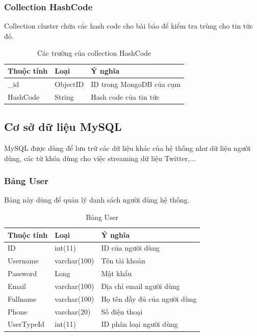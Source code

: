 		\subsubsection{Collection HashCode}
		Collection cluster chứa các hash code cho bài báo để kiểm tra trùng cho tin tức đó.
		\begin{table}[H]
			\setlength\extrarowheight{3pt}
			\begin{tabular}{|l|l|p{9cm}|}
				\hline
				\textbf{Thuộc tính}     & \textbf{Loại} & \textbf{Ý nghĩa} \\\hline
				\_id           & ObjectID       &  ID trong MongoDB của cụm\\\hline
				HashCode      & String           & Hash code của tin tức\\\hline
			\end{tabular}%
			\caption{Các trường của collection HashCode}
			\label{tab:table_3_3}%
		\end{table}%

	\subsection{Cơ sở dữ liệu MySQL}
	MySQL được dùng để lưu trữ các dữ liệu khác của hệ thống như dữ liệu người dùng, các từ khóa dùng cho việc streaming dữ liệu Twitter,...
		\subsubsection{Bảng User}
		Bảng này dùng để quản lý danh sách người dùng hệ thống.
			\begin{table}[H]
				\centering
				\setlength\extrarowheight{3pt}
				\begin{tabular}{|l|l|l|}
					\hline
					\textbf{Thuộc tính} & \textbf{Loại} & \textbf{Ý nghĩa} \\ \hline
					ID & int(11) & ID của người dùng\\\hline
					Username & varchar(100) &  Tên tài khoản\\\hline
					Password & Long &  Mật khẩu\\\hline
					Email & varchar(100) &  Địa chỉ email người dùng\\\hline
					Fullname & varchar(100) &  Họ tên đầy đủ của người dùng\\\hline
					Phone & varchar(20) &  Số điện thoại\\\hline
					UserTypeId & int(11) &  ID phân loại người dùng\\\hline
				\end{tabular}
				\caption{Bảng User}
				\label{tab:usertable}
			\end{table}
